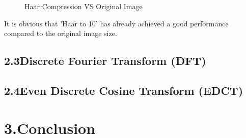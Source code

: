 \documentclass[12pt]{article}
\begin{document}
\begin{figure}[H]
    \centering
    \caption{Haar Compression VS Original Image}
    \label{ref_label_overall}
\end{figure}
\begin{flushleft}
It is obvious that 'Haar to 10' has already achieved a good performance compared to the original image size.
\end{flushleft}

\subsection*{2.3\quad Discrete Fourier Transform (DFT)}


\subsection*{2.4\quad Even Discrete Cosine Transform (EDCT)}




\section*{3.\quad Conclusion}
\end{document}
